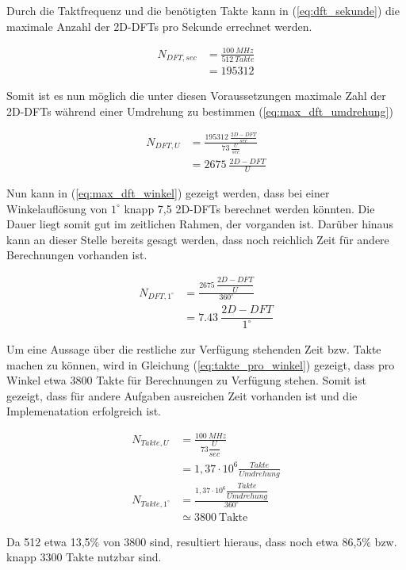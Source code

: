  Durch die Taktfrequenz und die benötigten Takte kann in (\ref{eq:dft_sekunde}) die maximale Anzahl der 2D-DFTs pro Sekunde errechnet werden.
 
 \begin{equation}\label{eq:dft_sekunde}
  \begin{split}
   N_{DFT, sec} &= \frac{\SI{100}{MHz}}{\SI{512}{Takte}}\\
                &= 195312
  \end{split}
 \end{equation}

 Somit ist es nun möglich die unter diesen Voraussetzungen maximale Zahl der 2D-DFTs während einer Umdrehung zu bestimmen (\ref{eq:max_dft_umdrehung})
 
 \begin{equation}\label{eq:max_dft_umdrehung}
  \begin{split}
   N_{DFT,U}  &= \frac{\SI{195312}{\frac{2D-DFT}{sec}}}{\SI{73}{\frac{U}{sec}}}\\
              &= \SI{2675}{\frac{2D-DFT}{U}}
  \end{split} 
 \end{equation}

 Nun kann in (\ref{eq:max_dft_winkel}) gezeigt werden, dass bei einer Winkelauflösung von $1^\circ$ knapp 7,5 2D-DFTs berechnet werden könnten. Die Dauer liegt somit 
 gut im zeitlichen Rahmen, der vorganden ist. Darüber hinaus kann an dieser Stelle bereits gesagt werden, dass noch reichlich Zeit für andere Berechnungen vorhanden ist.
 
 \begin{equation}\label{eq:max_dft_winkel}
  \begin{split}
   N_{DFT,1^\circ} &= \frac{\SI{2675}{\dfrac{2D-DFT}{U}}}{360^\circ}\\
                   &= \SI{7,43}{\dfrac{2D-DFT}{1^\circ}}
  \end{split}
 \end{equation}

 
 Um eine Aussage über die restliche zur Verfügung stehenden Zeit bzw. Takte machen zu können, wird in Gleichung (\ref{eq:takte_pro_winkel}) gezeigt, dass pro Winkel 
 etwa 3800 Takte für Berechnungen zu Verfügung stehen. Somit ist gezeigt, dass für andere Aufgaben ausreichen Zeit vorhanden ist und die Implemenatation 
 erfolgreich ist.
 
 \begin{equation}\label{eq:takte_pro_winkel}
  \begin{split}
   N_{Takte, U} &= \frac{\SI{100}{MHz}}{73\dfrac{U}{sec}}\\
                &= 1,37\cdot 10^6 \frac{Takte}{Umdrehung}\\
   N_{Takte, 1^\circ} &= \frac{1,37\cdot 10^6 \dfrac{Takte}{Umdrehung}}{360^\circ}\\
                      &\simeq 3800 \ \textrm{Takte}
  \end{split}
 \end{equation}

 Da 512 etwa 13,5$\%$ von 3800 sind, resultiert hieraus, dass noch etwa 86,5$\%$ bzw. knapp 3300 Takte nutzbar sind.

 
 